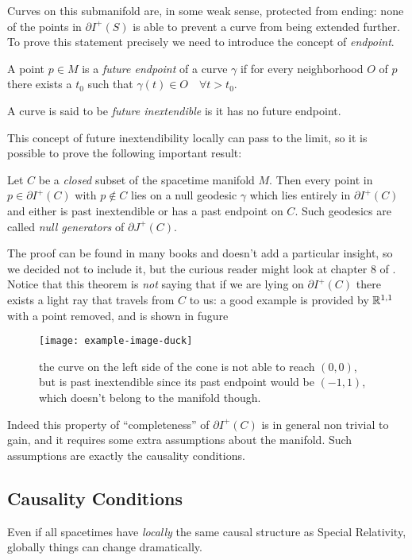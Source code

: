 Curves on this submanifold are, in some weak sense, protected from ending: none of the points in \(\partial I^+(S)\) is able to prevent a curve from being extended further. To prove this statement precisely we need to introduce the concept of \emph{endpoint}.
	\begin{definition}
		A point \(p\in M\) is a \emph{future endpoint} of a curve \(\gamma\) if for every neighborhood \(O\) of \(p\) there exists a \(t_0\) such that \(\gamma(t) \in O \quad \forall t >t_0\). 
		
		A curve is said to be \emph{future inextendible} is it has no future endpoint.
	\end{definition}

	This concept of future inextendibility locally can pass to the limit, 
	so it is possible to prove the following important result:
\begin{theorem}
	\label{th:null-generator}
	Let \(C\) be a \emph{closed} subset of the spacetime manifold \(M\). 
	Then every point in \(p\in \partial I^+(C)\) with \(p \notin C\) lies on a null 
	geodesic \(\gamma\) which lies entirely in \(\partial I^+(C)\) and either is 
	past inextendible or has a past endpoint on \(C\). Such geodesics are called \emph{null generators} of \(\partial J^+(C)\).
\end{theorem}

The proof can be found in many books and doesn't add a particular insight, so we 
decided not to include it, but the curious reader might look at chapter \(8\) 
of \cite{wald2010general}. 
Notice that this theorem is \emph{not} saying that if we are lying on \(\partial I^+(C)\) 
there exists a light ray that travels from \(C\) to us: a good example is provided by
\({\mathbb{R}}^{1,1}\) with a point removed, and is shown in fugure
\begin{figure}
	\centering
	\texttt{[image: example-image-duck]}
	\caption{the curve on the left side of the cone is not able to reach \((0,0)\), but
	is past inextendible since its past endpoint would be \((-1, 1)\), which doesn't belong
	to the manifold though.}
\end{figure}
Indeed this property of ``completeness'' of \(\partial I^+(C)\) is in general non trivial to gain, and it requires some extra assumptions about the manifold. Such assumptions are exactly the causality conditions.

\subsection{Causality Conditions}
Even if all spacetimes have \emph{locally} the same causal structure as Special Relativity, globally things can change dramatically.

